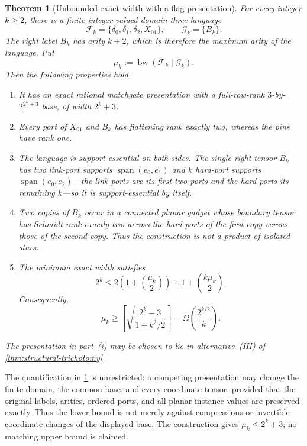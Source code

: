 \documentclass[11pt]{article}
\newtheorem{theorem}{Theorem}[section]
\theoremstyle{definition}
\theoremstyle{remark}
\newcommand{\cF}{\mathcal F}
\newcommand{\cG}{\mathcal G}
\newcommand{\bw}{\operatorname{bw}}
\newcommand{\Span}{\operatorname{span}}
\begin{document}
\begin{theorem}[Unbounded exact width with a flag presentation]
\label{thm:main}
For every integer $k\ge2$, there is a finite integer-valued domain-three
language
\[
  \cF_k=\{\delta_0,\delta_1,\delta_2,X_{01}\},
  \qquad \cG_k=\{B_k\}.
\]
The right label $B_k$ has arity $k+2$, which is therefore the maximum arity
of the language.  Put
\begin{equation}
  \mu_k:=\bw(\cF_k\mid\cG_k).
  \label{eq:muk-definition}
\end{equation}
Then the following properties hold.
\begin{enumerate}[label=\textup{(\roman*)}]
  \item It has an exact rational matchgate presentation with a full-row-rank
  $3$-by-$2^{2^k+3}$ base, of width $2^k+3$.
  \item Every port of $X_{01}$ and $B_k$ has flattening rank exactly two,
  whereas the pins have rank one.
  \item The language is support-essential on both sides.  The single right
  tensor $B_k$ has two link-port supports $\Span(e_0,e_1)$ and $k$
  hard-port supports $\Span(e_0,e_2)$---the link ports are its first two
  ports and the hard ports its remaining $k$---so it is support-essential
  by itself.
  \item Two copies of $B_k$ occur in a connected planar gadget whose
  boundary tensor has Schmidt rank exactly two across the hard ports of the
  first copy versus those of the second copy.  Thus the construction is not
  a product of isolated stars.
  \item The minimum exact width satisfies
  \begin{equation}
    2^k\le
    2\left(1+\binom{\mu_k}{2}\right)
    +1+\binom{k\mu_k}{2}.
    \label{eq:main-exact-lower-bound}
  \end{equation}
  Consequently,
  \begin{equation}
    \mu_k\ge
    \left\lceil\sqrt{\frac{2^k-3}{1+k^2/2}}\right\rceil
    =\Omega\!\left(\frac{2^{k/2}}{k}\right).
    \label{eq:main-readable-lower-bound}
  \end{equation}
\end{enumerate}
The presentation in part~\textup{(i)} may be chosen to lie in
alternative~\textup{(III)} of \cref{thm:structural-trichotomy}.
\end{theorem}

The quantification in \cref{thm:main} is unrestricted: a competing
presentation may change the finite domain, the common base, and every
coordinate tensor, provided that the original labels, arities, ordered
ports, and all planar instance values are preserved exactly.  Thus the
lower bound is not merely against compressions or invertible coordinate
changes of the displayed base.  The construction gives
$\mu_k\le2^k+3$; no matching upper bound is claimed.
\end{document}
